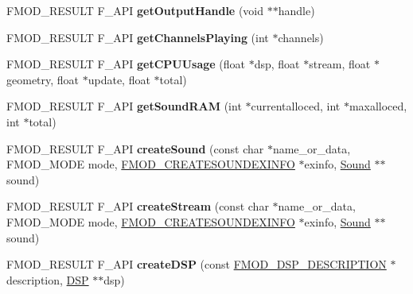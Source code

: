 \begin{DoxyCompactItemize}
F\+M\+O\+D\+\_\+\+R\+E\+S\+U\+LT F\+\_\+\+A\+PI {\bfseries get\+Output\+Handle} (void $\ast$$\ast$handle)
\item 
\mbox{\label{classFMOD_1_1System_a5188b4b34e150daf4cc64dde24ad1c1c}} 
F\+M\+O\+D\+\_\+\+R\+E\+S\+U\+LT F\+\_\+\+A\+PI {\bfseries get\+Channels\+Playing} (int $\ast$channels)
\item 
\mbox{\label{classFMOD_1_1System_a3faa4a44c39af4c49f5812bb000c43d4}} 
F\+M\+O\+D\+\_\+\+R\+E\+S\+U\+LT F\+\_\+\+A\+PI {\bfseries get\+C\+P\+U\+Usage} (float $\ast$dsp, float $\ast$stream, float $\ast$geometry, float $\ast$update, float $\ast$total)
\item 
\mbox{\label{classFMOD_1_1System_a406c76a44c183773616569d2cdec2036}} 
F\+M\+O\+D\+\_\+\+R\+E\+S\+U\+LT F\+\_\+\+A\+PI {\bfseries get\+Sound\+R\+AM} (int $\ast$currentalloced, int $\ast$maxalloced, int $\ast$total)
\item 
\mbox{\label{classFMOD_1_1System_aca0782c1d367a54ddf00aea484971735}} 
F\+M\+O\+D\+\_\+\+R\+E\+S\+U\+LT F\+\_\+\+A\+PI {\bfseries create\+Sound} (const char $\ast$name\+\_\+or\+\_\+data, F\+M\+O\+D\+\_\+\+M\+O\+DE mode, \hyperlink{structFMOD__CREATESOUNDEXINFO}{F\+M\+O\+D\+\_\+\+C\+R\+E\+A\+T\+E\+S\+O\+U\+N\+D\+E\+X\+I\+N\+FO} $\ast$exinfo, \hyperlink{classFMOD_1_1Sound}{Sound} $\ast$$\ast$sound)
\item 
\mbox{\label{classFMOD_1_1System_accec6ee2c51fccf5091098658b65491c}} 
F\+M\+O\+D\+\_\+\+R\+E\+S\+U\+LT F\+\_\+\+A\+PI {\bfseries create\+Stream} (const char $\ast$name\+\_\+or\+\_\+data, F\+M\+O\+D\+\_\+\+M\+O\+DE mode, \hyperlink{structFMOD__CREATESOUNDEXINFO}{F\+M\+O\+D\+\_\+\+C\+R\+E\+A\+T\+E\+S\+O\+U\+N\+D\+E\+X\+I\+N\+FO} $\ast$exinfo, \hyperlink{classFMOD_1_1Sound}{Sound} $\ast$$\ast$sound)
\item 
\mbox{\label{classFMOD_1_1System_a0b150ee5db127c245ae98285d2713326}} 
F\+M\+O\+D\+\_\+\+R\+E\+S\+U\+LT F\+\_\+\+A\+PI {\bfseries create\+D\+SP} (const \hyperlink{structFMOD__DSP__DESCRIPTION}{F\+M\+O\+D\+\_\+\+D\+S\+P\+\_\+\+D\+E\+S\+C\+R\+I\+P\+T\+I\+ON} $\ast$description, \hyperlink{classFMOD_1_1DSP}{D\+SP} $\ast$$\ast$dsp)
\item 

\end{DoxyCompactItemize}
